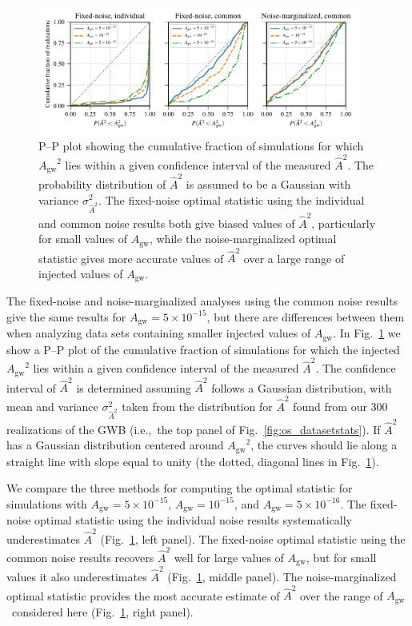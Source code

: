 \documentclass[twocolumn,aps,prd,superscriptaddress]{revtex4-1}
\newcommand{\Agw}{\ensuremath{A_\mathrm{gw}}}
\begin{document}
\begin{figure}[tb]
	\includegraphics[width=0.95\textwidth]{plots/pp_plot.pdf}
	\caption{P--P plot showing the cumulative fraction of simulations for which $\Agw^2$ lies within 
			a given confidence interval of the measured $\hat{A}^2$. 
			The probability distribution of $\hat{A}^2$ is assumed to be a Gaussian 
			with variance $\sigma^2_{\hat{A}^2}$. 
			The fixed-noise optimal statistic using the individual and common noise results 
			both give biased values of $\hat{A}^2$, particularly for small values of \Agw, 
			while the noise-marginalized optimal statistic gives more accurate values of $\hat{A}^2$ 
			over a large range of injected values of \Agw.}
	\label{fig:os_compare}
\end{figure}

The fixed-noise and noise-marginalized analyses 
using the common noise results give the same results 
for $\Agw = 5\times10^{-15}$, 
but there are differences between them when analyzing data sets 
containing smaller injected values of $\Agw$. 
In Fig.~\ref{fig:os_compare} we show a P--P plot 
of the cumulative fraction of simulations for which the injected $\Agw^2$ lies within 
a given confidence interval of the measured $\hat{A}^2$. 
The confidence interval of $\hat{A}^2$ is determined 
assuming $\hat{A}^2$ follows a Gaussian distribution, 
with mean and variance $\sigma^2_{\hat{A}^2}$ 
taken from the distribution for $\hat{A}^2$ 
found from our 300 realizations of the GWB (i.e.,~the top panel of Fig.~\ref{fig:os_datasetstats}).
If $\hat{A}^2$ has a Gaussian distribution centered around $\Agw^2$, 
the curves should lie along a straight line with slope equal to unity (the dotted, diagonal lines in Fig.~\ref{fig:os_compare}).

We compare the three methods for computing the optimal statistic for 
simulations with $\Agw=5\times10^{-15}$, $\Agw=10^{-15}$, and $\Agw=5\times10^{-16}$. 
The fixed-noise optimal statistic using the individual noise results systematically underestimates $\hat{A}^2$ 
(Fig.~\ref{fig:os_compare}, left panel). 
The fixed-noise optimal statistic using the common noise results 
recovers $\hat{A}^2$ well for large values of $\Agw$, but for small values it also underestimates $\hat{A}^2$ 
(Fig.~\ref{fig:os_compare}, middle panel). 
The noise-marginalized optimal statistic provides the most accurate estimate of $\hat{A}^2$ 
over the range of \Agw\ considered here (Fig.~\ref{fig:os_compare}, right panel).
\end{document}
